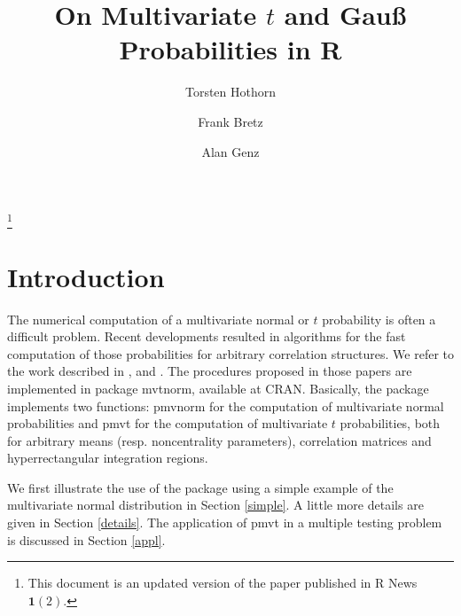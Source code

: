 \documentclass[11pt]{amsart}
\begin{document}
\title{On Multivariate $t$ and Gau{\ss} Probabilities in R}

\author{Torsten Hothorn}
\thanks{This document is an updated version of the paper published in
\textsf{R} News $\mathbf{1}(2)$.}
\address{Friedrich-Alexander-Universit\"at Erlangen-N\"urnberg \\
Institut f\"ur Medizininformatik, Biometrie und Epidemiologie \\
Waldstra{\ss}e 6, D-91054 Erlangen}
\author{Frank Bretz}
\address{Universit\"at Hannover \\ LG Bioinformatik, FB Gartenbau \\
Herrenh\"auser Str. 2 \\ D-30419 Hannover}
\author{Alan Genz}
\address{Department of Mathematics \\ Washington State University \\
Pullman, WA 99164-3113 USA}

\maketitle


\section*{Introduction}

The numerical computation of a multivariate normal or $t$
probability is often a difficult problem. Recent developments
resulted in algorithms for the fast computation of those
probabilities for arbitrary correlation structures. We refer to
the work described in \cite{numerical-:1992},
\cite{comparison:1993} and \cite{numerical-:1999}. The procedures
proposed in those papers are implemented in package {\ttfamily
mvtnorm}, available at CRAN. Basically, the package implements
two functions: {\ttfamily pmvnorm} for the computation of
multivariate normal probabilities and {\ttfamily pmvt} for the
computation of multivariate $t$ probabilities, both for arbitrary
means (resp. noncentrality parameters), correlation matrices and
hyperrectangular integration regions.

We first illustrate the use of the package using a simple example of the
multivariate normal distribution in Section \ref{simple}.
A little more details are given in Section \ref{details}. The application of
{\ttfamily pmvt} in a multiple testing problem is discussed in Section
\ref{appl}.
\end{document}

